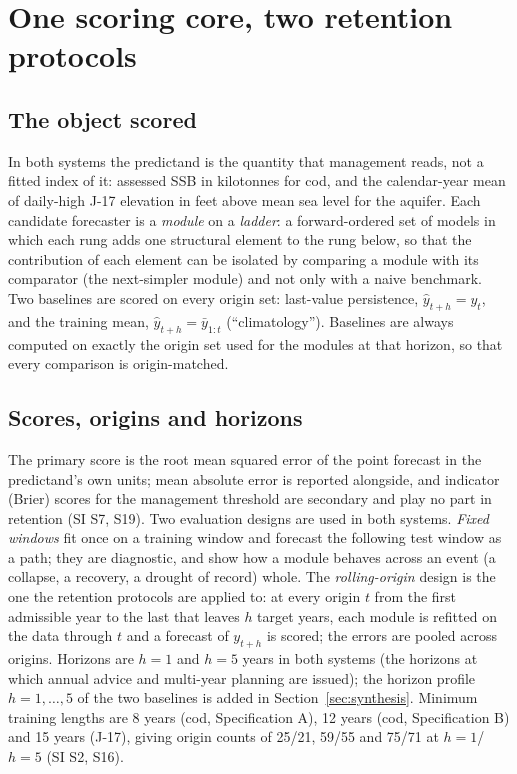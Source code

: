 \documentclass[preprint,11pt,authoryear]{elsarticle}
\theoremstyle{definition}
\theoremstyle{remark}
\begin{document}
\section{One scoring core, two retention protocols}\label{sec:design}

\subsection{The object scored}\label{sec:object}

In both systems the predictand is the quantity that management reads, not a fitted index of it: assessed SSB in kilotonnes for cod, and the calendar-year mean of daily-high J-17 elevation in feet above mean sea level for the aquifer. Each candidate forecaster is a \emph{module} on a \emph{ladder}: a forward-ordered set of models in which each rung adds one structural element to the rung below, so that the contribution of each element can be isolated by comparing a module with its comparator (the next-simpler module) and not only with a naive benchmark. Two baselines are scored on every origin set: last-value persistence, $\hat y_{t+h}=y_t$, and the training mean, $\hat y_{t+h}=\bar y_{1:t}$ (``climatology''). Baselines are always computed on exactly the origin set used for the modules at that horizon, so that every comparison is origin-matched.

\subsection{Scores, origins and horizons}\label{sec:scores}

The primary score is the root mean squared error of the point forecast in the predictand's own units; mean absolute error is reported alongside, and indicator (Brier) scores for the management threshold are secondary and play no part in retention (SI S7, S19). Two evaluation designs are used in both systems. \emph{Fixed windows} fit once on a training window and forecast the following test window as a path; they are diagnostic, and show how a module behaves across an event (a collapse, a recovery, a drought of record) whole. The \emph{rolling-origin} design \citep{Tashman2000} is the one the retention protocols are applied to: at every origin $t$ from the first admissible year to the last that leaves $h$ target years, each module is refitted on the data through $t$ and a forecast of $y_{t+h}$ is scored; the errors are pooled across origins. Horizons are $h=1$ and $h=5$ years in both systems (the horizons at which annual advice and multi-year planning are issued); the horizon profile $h=1,\dots,5$ of the two baselines is added in Section~\ref{sec:synthesis}. Minimum training lengths are 8 years (cod, Specification A), 12 years (cod, Specification B) and 15 years (J-17), giving origin counts of 25/21, 59/55 and 75/71 at $h=1$/$h=5$ (SI S2, S16).
\end{document}
